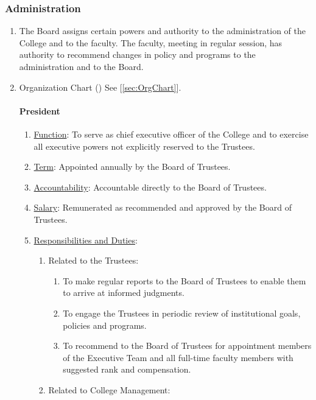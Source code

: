 		\subsubsection{Administration}
			\begin{enumerate}
				\item{The Board assigns certain powers and authority to the administration of the College and to the faculty. The faculty, meeting in regular session, has authority to recommend changes in policy and programs to the administration and to the Board.}
				\item{Organization Chart ()
				See [\autoref{sec:OrgChart}].


				\paragraph{President}
					\begin{enumerate}
						\item{\underline{Function}: To serve as chief executive officer of the College and to exercise all executive powers not explicitly reserved to the Trustees.  }
						\item{\underline{Term}: Appointed annually by the Board of Trustees.  }
						\item{\underline{Accountability}: Accountable directly to the Board of Trustees.  }
						\item{\underline{Salary}: Remunerated as recommended and approved by the Board of Trustees.  }
						\item{\underline{Responsibilities and Duties}:
							\begin{enumerate}
								\item{Related to the Trustees:
									\begin{enumerate}
										\item{To make regular reports to the Board of Trustees to enable them to arrive at informed judgments.}
										\item{To engage the Trustees in periodic review of institutional goals, policies and programs.}
										\item{To recommend to the Board of Trustees for appointment members of the Executive Team and all full-time faculty members with suggested rank and compensation.}
									\end{enumerate}
								}
								\item{Related to College Management:
}
\end{enumerate}}
\end{enumerate}}
\end{enumerate}
